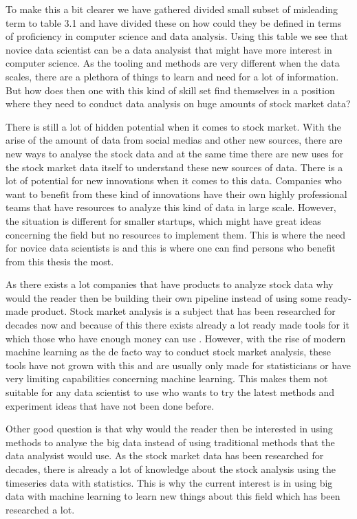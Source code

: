 To make this a bit clearer we have gathered divided small subset of misleading term to table 3.1 and have divided these on how could they be defined in terms of proficiency in computer science and data analysis.
Using this table we see that novice data scientist can be a data analysist that might have more interest in computer science.
As the tooling and methods are very different when the data scales, there are a plethora of things to learn and need for a lot of information.
But how does then one with this kind of skill set find themselves in a position where they need to conduct data analysis on huge amounts of stock market data?

There is still a lot of hidden potential when it comes to stock market.
With the arise of the amount of data from social medias and other new sources, there are new ways to analyse the stock data and at the same time there are new uses for the stock market data itself to understand these new sources of data.
There is a lot of potential for new innovations when it comes to this data.
Companies who want to benefit from these kind of innovations have their own highly professional teams that have resources to analyze this kind of data in large scale.
However, the situation is different for smaller startups, which might have great ideas concerning the field but no resources to implement them.
This is where the need for novice data scientists is and this is where one can find persons who benefit from this thesis the most.

As there exists a lot companies that have products to analyze stock data why would the reader then be building their own pipeline instead of using some ready-made product.
Stock market analysis is a subject that has been researched for decades now and because of this there exists already a lot ready made tools for it which those who have enough money can use \cite{metastock} \cite{worden}.
However, with the rise of modern machine learning as the de facto way to conduct stock market analysis, these tools have not grown with this and are usually only made for statisticians or have very limiting capabilities concerning machine learning.
This makes them not suitable for any data scientist to use who wants to try the latest methods and experiment ideas that have not been done before.

Other good question is that why would the reader then be interested in using methods to analyse the big data instead of using traditional methods that the data analysist would use.
As the stock market data has been researched for decades, there is already a lot of knowledge about the stock analysis using the timeseries data with statistics.
This is why the current interest is in using big data with machine learning to learn new things about this field which has been researched a lot.


